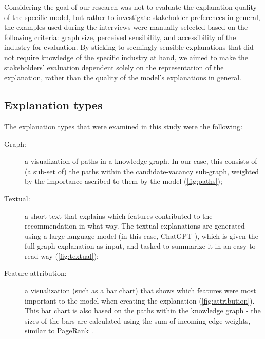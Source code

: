 Considering the goal of our research was not to evaluate the explanation quality of the specific model, but rather to investigate stakeholder preferences in general, the examples used during the interviews were manually selected based on the following criteria: graph size, perceived sensibility, and accessibility of the industry for evaluation. By sticking to seemingly sensible explanations that did not require knowledge of the specific industry at hand, we aimed to make the stakeholders' evaluation dependent solely on the representation of the explanation, rather than the quality of the model's explanations in general. 

\subsection{Explanation types}
\label{sec:explanation_types}
The explanation types that were examined in this study were the following:

\begin{description}
    \item[Graph:] a visualization of paths in a knowledge graph. In our case, this consists of (a sub-set of) the paths within the candidate-vacancy sub-graph, weighted by the importance ascribed to them by the model (\cref{fig:paths});
    \item[Textual:] a short text that explains which features contributed to the recommendation in what way. The textual explanations are generated using a large language model (in this case, ChatGPT \cite{openai2022chatgpt}), which is given the full graph explanation as input, and tasked to summarize it in an easy-to-read way (\cref{fig:textual}); 
    \item[Feature attribution:] a visualization (such as a bar chart) that shows which features were most important to the model when creating the explanation (\cref{fig:attribution}). This bar chart is also based on the paths within the knowledge graph - the sizes of the bars are calculated using the sum of incoming edge weights, similar to PageRank \cite{bianchini2005inside}.
\end{description}

